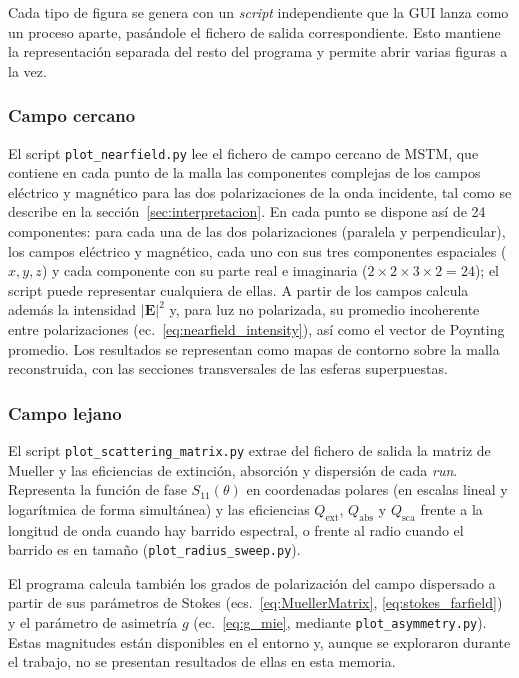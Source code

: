 Cada tipo de figura se genera con un \textit{script} independiente que la GUI lanza
como un proceso aparte, pasándole el fichero de salida correspondiente.
Esto mantiene la representación separada del resto del programa y permite
abrir varias figuras a la vez.

\subsubsection*{Campo cercano}

El script \texttt{plot\_nearfield.py} lee el fichero de campo cercano de
MSTM, que contiene en cada punto de la malla las componentes complejas de
los campos eléctrico y magnético para las dos polarizaciones de la onda
incidente, tal como se describe en la sección~\ref{sec:interpretacion}. En
cada punto se dispone así de 24 componentes: para cada una de las dos
polarizaciones (paralela y perpendicular), los campos eléctrico y
magnético, cada uno con sus tres componentes espaciales ($x,y,z$) y cada
componente con su parte real e imaginaria ($2\times2\times3\times2=24$); el
script puede representar cualquiera de ellas. A partir de los campos
calcula además la intensidad $|\mathbf{E}|^2$ y, para luz no polarizada,
su promedio incoherente entre polarizaciones
(ec.~\ref{eq:nearfield_intensity}), así como el vector de Poynting
promedio. Los resultados se representan como mapas de contorno sobre la
malla reconstruida, con las secciones transversales de las esferas
superpuestas.

\subsubsection*{Campo lejano}

El script \texttt{plot\_scattering\_matrix.py} extrae del fichero de
salida la matriz de Mueller y las eficiencias de extinción, absorción y
dispersión de cada \emph{run}. Representa la función de fase
$S_{11}(\theta)$ en coordenadas polares (en escalas lineal y logarítmica
de forma simultánea) y las eficiencias $Q_{\text{ext}}$, $Q_{\text{abs}}$
y $Q_{\text{sca}}$ frente a la longitud de onda cuando hay barrido
espectral, o frente al radio cuando el barrido es en tamaño
(\texttt{plot\_radius\_sweep.py}).

El programa calcula también los grados de polarización del campo
dispersado a partir de sus parámetros de Stokes
(ecs.~\ref{eq:MuellerMatrix}, \ref{eq:stokes_farfield}) y el parámetro de 
asimetría $g$
(ec.~\ref{eq:g_mie}, mediante \texttt{plot\_asymmetry.py}). Estas magnitudes 
están disponibles en el entorno y, aunque se exploraron durante el trabajo,
no se presentan resultados de ellas en esta memoria.